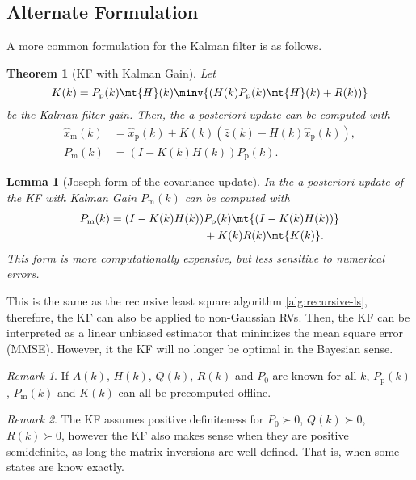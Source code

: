 \documentclass[]{hsrzf}
\theoremstyle{plain}
\newtheorem{thm}{Theorem}[section]
\newtheorem{lemma}{Lemma}[section]
\theoremstyle{definition}
\theoremstyle{remark}
\newtheorem*{remark}{Remark}
\begin{document}
\subsection{Alternate Formulation}

A more common formulation for the Kalman filter is as follows.

\begin{thm}[KF with Kalman Gain]
  Let
  \[
    K(k) = P_\mathrm{p}(k) \mt{H}(k) \minv{(
      H(k) P_\mathrm{p}(k) \mt{H}(k) + R(k)
    )}
  \]
  be the Kalman filter gain. Then, the a posteriori update can be computed
  with
  \begin{align*}
    \hat{x}_\mathrm{m}(k) &= \hat{x}_\mathrm{p}(k) + K(k)(
      \bar{z}(k) - H(k) \hat{x}_\mathrm{p}(k)
    ), \\
    P_\mathrm{m}(k) &= (I - K(k) H(k)) P_\mathrm{p}(k).
  \end{align*}
\end{thm}

\begin{lemma}[Joseph form of the covariance update]
  In the a posteriori update of the KF with Kalman Gain $P_\mathrm{m}(k)$ can
  be computed with
  \begin{align*}
    P_\mathrm{m}(k) = (I - K(k) H(k)) 
      &P_\mathrm{p}(k) \mt{(I - K(k) H(k))} \\
      &+ K(k) R(k) \mt{K(k)}.
  \end{align*}
  This form is more computationally expensive, but less sensitive to numerical
  errors.
\end{lemma}


This is the same as the recursive least square algorithm
\ref{alg:recursive-ls}, therefore, the KF can also be applied to non-Gaussian
RVs. Then, the KF can be interpreted as a linear unbiased estimator that
minimizes the mean square error (MMSE). However, it the KF will no longer be
optimal in the Bayesian sense.

\begin{remark}
  If $A(k)$, $H(k)$, $Q(k)$, $R(k)$ and $P_0$ are known for all $k$,
  $P_\mathrm{p}(k)$, $P_\mathrm{m}(k)$ and $K(k)$ can all be precomputed
  offline.
\end{remark}

\begin{remark}
  The KF assumes positive definiteness for $P_0 \succ 0$, $Q(k) \succ 0$,
  $R(k) \succ 0$, however the KF also makes sense when they are positive
  semidefinite, as long the matrix inversions are well defined. That is, when
  some states are know exactly.
\end{remark}
\end{document}
